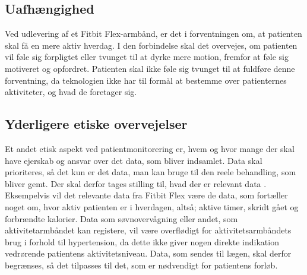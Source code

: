 \subsection{Uafhængighed}

Ved udlevering af et Fitbit Flex-armbånd, er det i forventningen om, at patienten skal få en mere aktiv hverdag. I den forbindelse skal det overvejes, om patienten vil føle sig forpligtet eller tvunget til at dyrke mere motion, fremfor at føle sig motiveret og opfordret. Patienten skal ikke føle sig tvunget til at fuldføre denne forventning, da teknologien ikke har til formål at bestemme over patienternes aktiviteter, og hvad de foretager sig. \citep{Nordgren2013}

\subsection{Yderligere etiske overvejelser}
Et andet etisk aspekt ved patientmonitorering er, hvem og hvor mange der skal have ejerskab og ansvar over det data, som bliver indsamlet. Data skal prioriteres, så det kun er det data, man kan bruge til den reele behandling, som bliver gemt. Der skal derfor tages stilling til, hvad der er relevant data \citep{patienthome2015}. Eksempelvis vil det relevante data fra Fitbit Flex være de data, som fortæller noget om, hvor aktiv patienten er i hverdagen, altså; aktive timer, skridt gået og forbrændte kalorier. Data som søvnovervågning eller andet, som aktivitetarmbåndet kan registere, vil være overflødigt for aktivitetsarmbåndets brug i forhold til hypertension, da dette ikke giver nogen direkte indikation vedrørende patientens aktivitetsniveau. Data, som sendes til lægen, skal derfor begrænses, så det tilpasses til det, som er nødvendigt for patientens forløb. 














